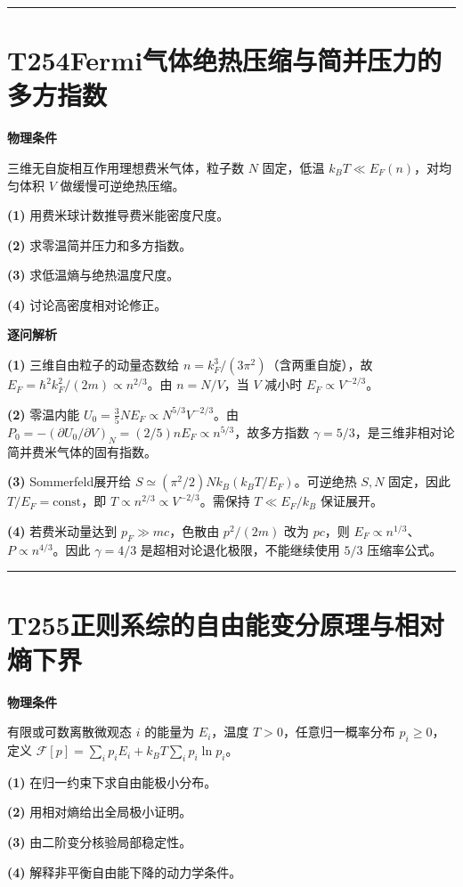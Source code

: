 \documentclass[UTF8,a4paper,11pt,oneside,openany]{ctexbook}
\begin{document}
\par\bigskip\hrule\bigskip
\section*{T254\quad Fermi气体绝热压缩与简并压力的多方指数}
\textbf{物理条件}\par 三维无自旋相互作用理想费米气体，粒子数 \(N\) 固定，低温 \(k_BT\ll E_F(n)\)，对均匀体积 \(V\) 做缓慢可逆绝热压缩。
\par\noindent\textbf{(1)} 用费米球计数推导费米能密度尺度。
\par\noindent\textbf{(2)} 求零温简并压力和多方指数。
\par\noindent\textbf{(3)} 求低温熵与绝热温度尺度。
\par\noindent\textbf{(4)} 讨论高密度相对论修正。

\par\medskip\noindent\textbf{逐问解析}
\par\noindent\textbf{(1)} 三维自由粒子的动量态数给 \(n=k_F^3/(3\pi^2)\)（含两重自旋），故 \(E_F=\hbar^2k_F^2/(2m)\propto n^{2/3}\)。由 \(n=N/V\)，当 \(V\) 减小时 \(E_F\propto V^{-2/3}\)。
\par\noindent\textbf{(2)} 零温内能 \(U_0=\tfrac35NE_F\propto N^{5/3}V^{-2/3}\)。由 \(P_0=-(\partial U_0/\partial V)_N=(2/5)nE_F\propto n^{5/3}\)，故多方指数 \(\gamma=5/3\)，是三维非相对论简并费米气体的固有指数。
\par\noindent\textbf{(3)} Sommerfeld展开给 \(S\simeq(\pi^2/2)Nk_B(k_BT/E_F)\)。可逆绝热 \(S,N\) 固定，因此 \(T/E_F=\mathrm{const}\)，即 \(T\propto n^{2/3}\propto V^{-2/3}\)。需保持 \(T\ll E_F/k_B\) 保证展开。
\par\noindent\textbf{(4)} 若费米动量达到 \(p_F\gg mc\)，色散由 \(p^2/(2m)\) 改为 \(pc\)，则 \(E_F\propto n^{1/3}\)、\(P\propto n^{4/3}\)。因此 \(\gamma=4/3\) 是超相对论退化极限，不能继续使用 \(5/3\) 压缩率公式。

\par\bigskip\hrule\bigskip
\section*{T255\quad 正则系综的自由能变分原理与相对熵下界}
\textbf{物理条件}\par 有限或可数离散微观态 \(i\) 的能量为 \(E_i\)，温度 \(T>0\)，任意归一概率分布 \(p_i\ge0\)，定义 \(\mathcal F[p]=\sum_i p_iE_i+k_BT\sum_i p_i\ln p_i\)。
\par\noindent\textbf{(1)} 在归一约束下求自由能极小分布。
\par\noindent\textbf{(2)} 用相对熵给出全局极小证明。
\par\noindent\textbf{(3)} 由二阶变分核验局部稳定性。
\par\noindent\textbf{(4)} 解释非平衡自由能下降的动力学条件。
\end{document}
